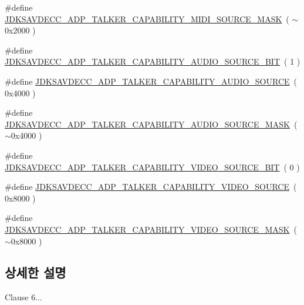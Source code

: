 \begin{DoxyCompactItemize}
\item 
\#define \hyperlink{group__talker__capability_ga5792972e4715949f1c29b7d65ea08873}{J\+D\+K\+S\+A\+V\+D\+E\+C\+C\+\_\+\+A\+D\+P\+\_\+\+T\+A\+L\+K\+E\+R\+\_\+\+C\+A\+P\+A\+B\+I\+L\+I\+T\+Y\+\_\+\+M\+I\+D\+I\+\_\+\+S\+O\+U\+R\+C\+E\+\_\+\+M\+A\+SK}~( $\sim$0x2000 )
\item 
\#define \hyperlink{group__talker__capability_ga3443b6354d608d955d0e755f2b9b90e1}{J\+D\+K\+S\+A\+V\+D\+E\+C\+C\+\_\+\+A\+D\+P\+\_\+\+T\+A\+L\+K\+E\+R\+\_\+\+C\+A\+P\+A\+B\+I\+L\+I\+T\+Y\+\_\+\+A\+U\+D\+I\+O\+\_\+\+S\+O\+U\+R\+C\+E\+\_\+\+B\+IT}~( 1 )
\item 
\#define \hyperlink{group__talker__capability_gabc242a5defdecf66f8d1a2967d0b635a}{J\+D\+K\+S\+A\+V\+D\+E\+C\+C\+\_\+\+A\+D\+P\+\_\+\+T\+A\+L\+K\+E\+R\+\_\+\+C\+A\+P\+A\+B\+I\+L\+I\+T\+Y\+\_\+\+A\+U\+D\+I\+O\+\_\+\+S\+O\+U\+R\+CE}~( 0x4000 )
\item 
\#define \hyperlink{group__talker__capability_gae0681f2ac50e08a3163ee52d9dcbf576}{J\+D\+K\+S\+A\+V\+D\+E\+C\+C\+\_\+\+A\+D\+P\+\_\+\+T\+A\+L\+K\+E\+R\+\_\+\+C\+A\+P\+A\+B\+I\+L\+I\+T\+Y\+\_\+\+A\+U\+D\+I\+O\+\_\+\+S\+O\+U\+R\+C\+E\+\_\+\+M\+A\+SK}~( $\sim$0x4000 )
\item 
\#define \hyperlink{group__talker__capability_gaaee55f53d319e706b044dd62e0fa1f6e}{J\+D\+K\+S\+A\+V\+D\+E\+C\+C\+\_\+\+A\+D\+P\+\_\+\+T\+A\+L\+K\+E\+R\+\_\+\+C\+A\+P\+A\+B\+I\+L\+I\+T\+Y\+\_\+\+V\+I\+D\+E\+O\+\_\+\+S\+O\+U\+R\+C\+E\+\_\+\+B\+IT}~( 0 )
\item 
\#define \hyperlink{group__talker__capability_ga3669038bf65af52d19aff5059304b004}{J\+D\+K\+S\+A\+V\+D\+E\+C\+C\+\_\+\+A\+D\+P\+\_\+\+T\+A\+L\+K\+E\+R\+\_\+\+C\+A\+P\+A\+B\+I\+L\+I\+T\+Y\+\_\+\+V\+I\+D\+E\+O\+\_\+\+S\+O\+U\+R\+CE}~( 0x8000 )
\item 
\#define \hyperlink{group__talker__capability_ga153f9d5041c2da38790b811899e84172}{J\+D\+K\+S\+A\+V\+D\+E\+C\+C\+\_\+\+A\+D\+P\+\_\+\+T\+A\+L\+K\+E\+R\+\_\+\+C\+A\+P\+A\+B\+I\+L\+I\+T\+Y\+\_\+\+V\+I\+D\+E\+O\+\_\+\+S\+O\+U\+R\+C\+E\+\_\+\+M\+A\+SK}~( $\sim$0x8000 )
\end{DoxyCompactItemize}


\subsection{상세한 설명}

\begin{DoxyItemize}
\item Clause 6... 
\end{DoxyItemize}

